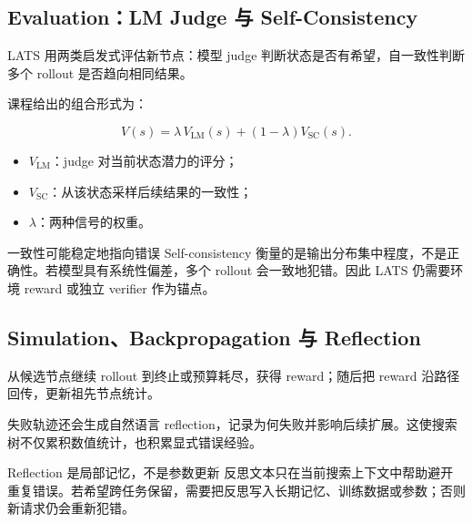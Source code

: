 \documentclass[a4paper]{article}
\begin{document}
\subsection{Evaluation：LM Judge 与 Self-Consistency}

LATS 用两类启发式评估新节点：模型 judge 判断状态是否有希望，自一致性判断多个 rollout 是否趋向相同结果。


课程给出的组合形式为：

$$
V(s)=\lambda\,V_{\mathrm{LM}}(s)+(1-\lambda)V_{\mathrm{SC}}(s).
$$

\begin{itemize}
    \item $V_{\mathrm{LM}}$：judge 对当前状态潜力的评分；
    \item $V_{\mathrm{SC}}$：从该状态采样后续结果的一致性；
    \item $\lambda$：两种信号的权重。
\end{itemize}

\begin{warningbox}{一致性可能稳定地指向错误}
Self-consistency 衡量的是输出分布集中程度，不是正确性。若模型具有系统性偏差，多个 rollout 会一致地犯错。因此 LATS 仍需要环境 reward 或独立 verifier 作为锚点。
\end{warningbox}

\subsection{Simulation、Backpropagation 与 Reflection}

从候选节点继续 rollout 到终止或预算耗尽，获得 reward；随后把 reward 沿路径回传，更新祖先节点统计。



失败轨迹还会生成自然语言 reflection，记录为何失败并影响后续扩展。这使搜索树不仅累积数值统计，也积累显式错误经验。

\begin{knowledgebox}{Reflection 是局部记忆，不是参数更新}
反思文本只在当前搜索上下文中帮助避开重复错误。若希望跨任务保留，需要把反思写入长期记忆、训练数据或参数；否则新请求仍会重新犯错。
\end{knowledgebox}
\end{document}
